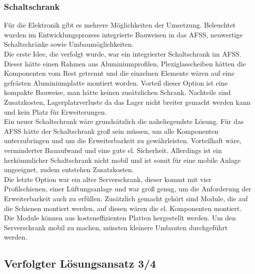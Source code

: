 \subsubsection{Schaltschrank}
Für die Elektronik gibt es mehrere Möglichkeiten der Umsetzung. Beleuchtet wurden im Entwicklungsprozess integrierte Bauweisen in das AFSS, neuwertige Schaltschränke sowie Umbaumöglichkeiten.\\
Die erste Idee, die verfolgt wurde, war ein integrierter Schaltschrank im AFSS. Dieser hätte einen Rahmen aus Aluminiumprofilen, Plexiglasscheiben hätten die Komponenten vom Rest getrennt und die einzelnen Elemente wären auf eine gefrästen Aluminiumplatte montiert worden. Vorteil dieser Option ist eine kompakte Bauweise, man hätte keinen zusätzlichen Schrank. Nachteile sind Zusatzkosten, Lagerplatzverluste da das Lager nicht breiter gemacht werden kann und kein Platz für Erweiterungen.\\
Ein neuer Schaltschrank wäre grundsätzlich die naheliegendste  Lösung. Für das AFSS hätte der Schaltschrank groß sein müssen, um alle Komponenten unterzubringen und um die Erweiterbarkeit zu gewährleisten. Vorteilhaft wäre, verminderter Bauaufwand und eine gute el. Sicherheit. Allerdings ist ein herkömmlicher Schaltschrank nicht mobil und ist somit für eine mobile Anlage ungeeignet, zudem entstehen Zusatzkosten.\\	
Die letzte Option war ein alter Serverschrank, dieser kommt mit vier Profilschienen, einer Lüftungsanlage und war groß genug, um die Anforderung der Erweiterbarkeit auch zu erfüllen. Zusätzlich gemacht gehört sind Module, die auf die Schienen montiert werden, auf diesen wären die el. Komponenten montiert. Die Module können aus kosteneffizienten Platten hergestellt werden. Um den Serverschrank mobil zu machen, müssten kleinere Umbauten durchgeführt werden.




\subsection{Verfolgter Lösungsansatz 3/4}

